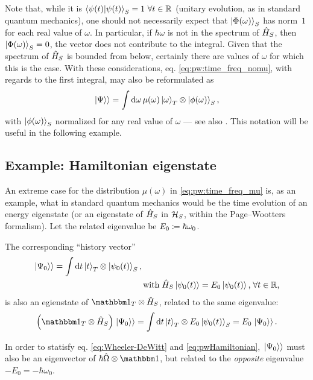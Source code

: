 Note that,
while it is $\braket{\psi(t)}_S = 1 \ \forall t \in \mathbb{R}$ (unitary evolution,
as in standard quantum mechanics),
one should not necessarily expect that
$\ket{\Phi(\omega)}_S$ has norm~$1$ for each real value of $\omega$.
In particular, if $\hbar\omega$ is not in the spectrum of $\hat{H}_S$,
then $\ket{\Phi(\omega)}_S = 0$, the vector does not contribute to the integral.
Given that the spectrum of $\hat{H}_S$ is bounded from below,
certainly there are values of $\omega$ for which this is the case.
With these considerations, eq. \eqref{eq:pw:time_freq_nomu}, with regards to the first integral, may also be reformulated as
\begin{equation}\label{eq:pw:time_freq_mu}
  \left.\left| \Psi \right\rangle\right\rangle =
    \int \dd{\omega} \mu(\omega) \ket{\omega}_{T} \otimes \ket{\phi(\omega)}_{S} \text{,}
\end{equation}
with $\ket{\phi(\omega)}_{S}$ normalized for any real value of $\omega$
--- see also \cite[eq.~(10)]{Lloyd:Time}.
This notation will be useful in the following example.

\subsection{Example: Hamiltonian eigenstate}

An extreme case for the distribution %
$\mu(\omega)$ in \eqref{eq:pw:time_freq_mu} %
is, as an example, what in standard quantum mechanics would be the time evolution of an energy eigenstate
(or an eigenstate of $\hat{H}_S$ in $\mathcal{H}_S$, within the Page--Wootters formalism).
Let the related eigenvalue be $E_0 \coloneqq \hbar\omega_{0}$.

The corresponding ``history vector''
\begin{align*}
  \dket{\Psi_0} = \int \dd{t} \ket{t}_T \ox \ket{\psi_0(t)}_S %
  \text{,} \, & 
  \\
              & \text{with} \;
  \op{H}_S \ket{\psi_0(t)} = E_0 \ket{\psi_0(t)} \text{,} \;  \forall t \in \mathbb{R} \text{,}
\end{align*}
is also an egienstate of $\idop_T \ox \op{H}_S$, related to the same eigenvalue:
\[
  \qty(\idop_T \ox \op{H}_S) \dket{\Psi_0} = \int \dd{t} \ket{t}_T \ox E_0 \ket{\psi_{0}(t)}_S = E_0 \dket{\Psi_0} \text{.}
\]

In order to statisfy eq. \eqref{eq:Wheeler-DeWitt} and \eqref{eq:pwHamiltonian},
$\left.\left| \Psi_0 \right\rangle\right\rangle$ must also be an eigenvector of $\hbar\op{\Omega} \ox \idop$,
but related to the \emph{opposite} eigenvalue $-E_0 = -\hbar\omega_0$.

